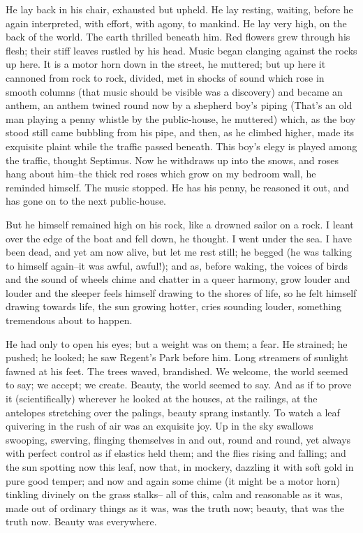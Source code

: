 \documentclass[lang=cn,10pt]{elegantbook}
\begin{document}
He lay back in his chair, exhausted but upheld.  He lay resting,
waiting, before he again interpreted, with effort, with agony, to
mankind.  He lay very high, on the back of the world.  The earth
thrilled beneath him.  Red flowers grew through his flesh; their
stiff leaves rustled by his head.  Music began clanging against the
rocks up here.  It is a motor horn down in the street, he muttered;
but up here it cannoned from rock to rock, divided, met in shocks
of sound which rose in smooth columns (that music should be visible
was a discovery) and became an anthem, an anthem twined round now
by a shepherd boy's piping (That's an old man playing a penny
whistle by the public-house, he muttered) which, as the boy stood
still came bubbling from his pipe, and then, as he climbed higher,
made its exquisite plaint while the traffic passed beneath.  This
boy's elegy is played among the traffic, thought Septimus.  Now he
withdraws up into the snows, and roses hang about him--the thick
red roses which grow on my bedroom wall, he reminded himself.  The
music stopped.  He has his penny, he reasoned it out, and has gone
on to the next public-house.

But he himself remained high on his rock, like a drowned sailor on
a rock.  I leant over the edge of the boat and fell down, he
thought.  I went under the sea.  I have been dead, and yet am now
alive, but let me rest still; he begged (he was talking to himself
again--it was awful, awful!); and as, before waking, the voices of
birds and the sound of wheels chime and chatter in a queer harmony,
grow louder and louder and the sleeper feels himself drawing to the
shores of life, so he felt himself drawing towards life, the sun
growing hotter, cries sounding louder, something tremendous about
to happen.

He had only to open his eyes; but a weight was on them; a fear.  He
strained; he pushed; he looked; he saw Regent's Park before him.
Long streamers of sunlight fawned at his feet.  The trees waved,
brandished.  We welcome, the world seemed to say; we accept; we
create.  Beauty, the world seemed to say.  And as if to prove it
(scientifically) wherever he looked at the houses, at the railings,
at the antelopes stretching over the palings, beauty sprang
instantly.  To watch a leaf quivering in the rush of air was an
exquisite joy.  Up in the sky swallows swooping, swerving, flinging
themselves in and out, round and round, yet always with perfect
control as if elastics held them; and the flies rising and falling;
and the sun spotting now this leaf, now that, in mockery, dazzling
it with soft gold in pure good temper; and now and again some chime
(it might be a motor horn) tinkling divinely on the grass stalks--
all of this, calm and reasonable as it was, made out of ordinary
things as it was, was the truth now; beauty, that was the truth
now.  Beauty was everywhere.
\end{document}
